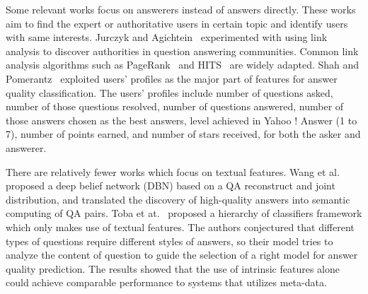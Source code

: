 Some relevant works focus on answerers instead of answers directly. These works aim to find the expert or authoritative users in certain topic and identify users with same interests. Jurczyk and Agichtein~ experimented with using link analysis to discover authorities in question answering communities. Common link analysis algorithms such as PageRank~\cite{page1999pagerank} and HITS~\cite{kleinberg1999authoritative} are widely adapted. Shah and Pomerantz~ exploited users' profiles as the major part of features for answer quality classification. The users' profiles include number of questions asked, number of those questions resolved, number of questions answered, number of those answers chosen as the best answers, level achieved in Yahoo ! Answer (1 to 7), number of points earned, and number of stars received, for both the asker and answerer.

There are relatively fewer works which focus on textual features. Wang et al.~ proposed a deep belief network (DBN) based on a QA reconstruct and joint distribution, and translated the discovery of high-quality answers into semantic computing of QA pairs. Toba et at.~ proposed a hierarchy of classifiers framework which only makes use of textual features. The authors conjectured that different types of questions require different styles of answers, so their model tries to analyze the content of question to guide the selection of a right model for answer quality prediction. The results showed that the use of intrinsic features alone could achieve comparable performance to systems that utilizes meta-data.

